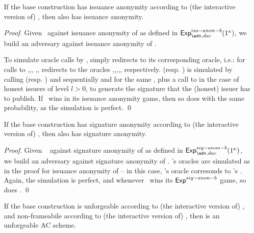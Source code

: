 \begin{theorem}
  If the base \CUASGenInt construction has issuance anonymity according to
  (the interactive version of) , then \CUASDAC
  also has issuance anonymity.
\end{theorem}

\begin{proof}
  Given \adv~against issuance anonymity of \CUASDAC as defined in
  $\Exp^{iss-anon-b}_{\adv,dac}(1^\secpar)$, we build an adversary \advB against
  issuance anonymity of \CUASGenInt.

  To simulate oracle calls by \adv, \advB simply redirects to its corresponding
  oracle, i.e.: for calls to ,,,
  ,, \advB redirects to the \CUASGenInt oracles
  \HUGEN,\CUGEN,\OBTAIN,\SIGN,\OBTCHALb, respectively.  (resp.
  ) is simulated by calling \HUGEN (resp. \CUGEN) and \ISET
  sequentially and for the same \uid, plus a call to \SIGN in the case of
  honest issuers of level $l>0$, to generate the signature \Sig that the
  (honest) issuer has to publish.
  If \adv~wins in its issuance anonymity game, then so does \advB with the same
  probability, as the simulation is perfect.
  \qed
\end{proof}

\begin{theorem}
  If the base \CUASGenInt construction has signature anonymity according to
  (the interactive version of) , then \CUASDAC
  also has signature anonymity.
\end{theorem}

\begin{proof}
  Given \adv~ against signature anonymity of \CUASDAC as defined in
  $\Exp^{sig-anon-b}_{\adv,dac}(1^\secpar)$, we build an adversary \advB against
  signature anonymity of \CUASGenInt.
  \adv's oracles are simulated as in the proof for issuance anonymity of
  \CUASDAC -- in this case, \adv's  oracle corresonds to \advB's
  \CHALb. Again, the simulation is perfect, and whenever \adv~wins its
  $\mathsf{Exp}^{sig-anon-b}$ game, so does \advB.
  \qed
\end{proof}

\begin{theorem}
  If the base \CUASGenInt construction is unforgeable according to (the
  interactive version of) , and non-frameabile according
  to (the interactive version of) , then \CUASAC is an
  unforgeable AC scheme.
\end{theorem}

